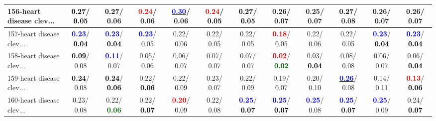 \begin{table}[h]
\begin{center}
{\begin{tabular}{lc|c|c|c|c|c|c|c|c|c|c}
156-heart disease clev... & \textcolor{black}{\textbf{  0.27}}/\textcolor{black}{\textbf{  0.05}} & \textcolor{black}{\textbf{  0.27}}/  0.06 & \textcolor{red}{\textbf{  0.24}}/  0.06 & \underline{\textcolor{blue}{\textbf{  0.30}}}/  0.06 & \textcolor{red}{\textbf{  0.24}}/\textcolor{black}{\textbf{  0.05}} & \textcolor{black}{\textbf{  0.27}}/\textcolor{black}{\textbf{  0.05}} &   0.26/  0.07 &   0.25/  0.07 & \textcolor{black}{\textbf{  0.27}}/  0.08 &   0.26/  0.07 &   0.26/  0.07 \\ \hline
157-heart disease clev... & \textcolor{blue}{\textbf{  0.23}}/\textcolor{black}{\textbf{  0.04}} & \textcolor{blue}{\textbf{  0.23}}/\textcolor{black}{\textbf{  0.04}} & \textcolor{blue}{\textbf{  0.23}}/  0.05 &   0.22/  0.06 &   0.22/  0.05 &   0.22/  0.05 & \textcolor{red}{\textbf{  0.18}}/  0.05 &   0.22/  0.06 &   0.22/  0.05 & \textcolor{blue}{\textbf{  0.23}}/\textcolor{black}{\textbf{  0.04}} & \textcolor{blue}{\textbf{  0.23}}/\textcolor{black}{\textbf{  0.04}} \\
158-heart disease clev... & \textcolor{black}{\textbf{  0.09}}/  0.08 & \underline{\textcolor{blue}{\textbf{  0.11}}}/  0.07 &   0.05/  0.06 &   0.06/  0.07 &   0.07/  0.07 &   0.07/  0.07 & \textcolor{red}{\textbf{  0.02}}/\textcolor{darkgreen}{\textbf{  0.02}} &   0.03/\textcolor{black}{\textbf{  0.04}} &   0.08/  0.08 &   0.06/  0.07 &   0.06/\textcolor{black}{\textbf{  0.04}} \\
159-heart disease clev... & \textcolor{black}{\textbf{  0.24}}/  0.08 & \textcolor{black}{\textbf{  0.24}}/\textcolor{black}{\textbf{  0.06}} &   0.22/\textcolor{black}{\textbf{  0.06}} &   0.22/  0.09 &   0.23/  0.07 &   0.22/  0.09 &   0.19/  0.07 &   0.20/  0.10 & \underline{\textcolor{blue}{\textbf{  0.26}}}/  0.08 &   0.14/  0.11 & \textcolor{red}{\textbf{  0.13}}/\textcolor{black}{\textbf{  0.06}} \\
160-heart disease clev... &   0.23/  0.08 &   0.22/\textcolor{darkgreen}{\textbf{  0.06}} &   0.22/\textcolor{black}{\textbf{  0.07}} & \textcolor{red}{\textbf{  0.20}}/  0.09 &   0.22/  0.08 & \textcolor{blue}{\textbf{  0.25}}/\textcolor{black}{\textbf{  0.07}} & \textcolor{blue}{\textbf{  0.25}}/\textcolor{black}{\textbf{  0.07}} & \textcolor{blue}{\textbf{  0.25}}/  0.08 & \textcolor{blue}{\textbf{  0.25}}/\textcolor{black}{\textbf{  0.07}} & \textcolor{blue}{\textbf{  0.25}}/  0.09 &   0.24/\textcolor{black}{\textbf{  0.07}} \\\end{tabular}}\label{stratsALCKappa4AllReduxHalfa}
\end{center}
\end{table}
